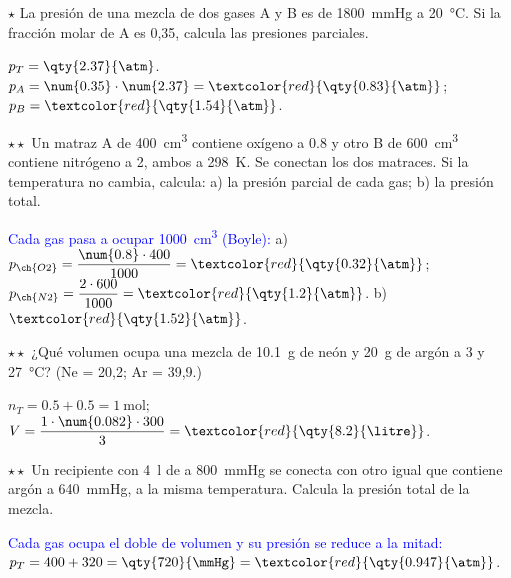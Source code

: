 \begin{exercise}
    \(\star\) La presión de una mezcla de dos gases A y B es de \qty{1800}{\mmHg} a \qty{20}{\degreeCelsius}. Si la fracción molar de A es
    0,35, calcula las presiones parciales.
    \begin{solu}
        \(p_T = \qty{2.37}{\atm}\). \(p_A = \num{0.35} \cdot \num{2.37} = \textcolor{red}{\qty{0.83}{\atm}}\); \(p_B = \textcolor{red}{\qty{1.54}{\atm}}\).
    \end{solu}
\end{exercise}

\begin{exercise}
    \(\star\star\) Un matraz A de \qty{400}{\cubic\centi\metre} contiene oxígeno a \qty{0.8}{\atm} y otro B de \qty{600}{\cubic\centi\metre}
    contiene nitrógeno a \qty{2}{\atm}, ambos a \qty{298}{\kelvin}. Se conectan los dos matraces. Si la temperatura no cambia, calcula:
    a) la presión parcial de cada gas; b) la presión total.
    \begin{solu}
        \textcolor{blue}{Cada gas pasa a ocupar \qty{1000}{\cubic\centi\metre} (Boyle):} a) \(p_{\ch{O2}} = \dfrac{\num{0.8} \cdot 400}{1000} =
        \textcolor{red}{\qty{0.32}{\atm}}\); \(p_{\ch{N2}} = \dfrac{2 \cdot 600}{1000} = \textcolor{red}{\qty{1.2}{\atm}}\). b) \(\textcolor{red}{\qty{1.52}{\atm}}\).
    \end{solu}
\end{exercise}

\begin{exercise}
    \(\star\star\) ¿Qué volumen ocupa una mezcla de \qty{10.1}{\gram} de neón y \qty{20}{\gram} de argón a \qty{3}{\atm} y \qty{27}{\degreeCelsius}?
    (Ne = 20,2; Ar = 39,9.)
    \begin{solu}
        \(n_T = \num{0.5} + \num{0.5} = \qty{1}{\mole}\); \(V = \dfrac{1 \cdot \num{0.082} \cdot 300}{3} = \textcolor{red}{\qty{8.2}{\litre}}\).
    \end{solu}
\end{exercise}

\begin{exercise}
    \(\star\star\) Un recipiente con \qty{4}{\litre} de  a \qty{800}{\mmHg} se conecta con otro igual que contiene argón a
    \qty{640}{\mmHg}, a la misma temperatura. Calcula la presión total de la mezcla.
    \begin{solu}
        \textcolor{blue}{Cada gas ocupa el doble de volumen y su presión se reduce a la mitad:} \(p_T = 400 + 320 = \qty{720}{\mmHg} =
        \textcolor{red}{\qty{0.947}{\atm}}\).
    \end{solu}
\end{exercise}


